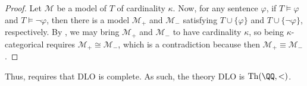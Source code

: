 \documentclass[../notes.tex]{subfiles}
\begin{document}
\begin{proof}
	Let $\mathcal M$ be a model of $T$ of cardinality $\kappa$. Now, for any sentence $\varphi$, if $T\models\varphi$ and $T\models\lnot\varphi$, then there is a model $\mathcal M_+$ and $\mathcal M_-$ satisfying $T\cup\{\varphi\}$ and $T\cup\{\lnot\varphi\}$, respectively. By , we may bring $\mathcal M_+$ and $\mathcal M_-$ to have cardinality $\kappa$, so being $\kappa$-categorical requires $\mathcal M_+\cong\mathcal M_-$, which is a contradiction because then $\mathcal M_+\equiv\mathcal M_-$.
\end{proof}
\begin{example}
	Thus,  requires that $\mathrm{DLO}$ is complete. As such, the theory $\mathrm{DLO}$ is $\mathrm{Th}(\QQ,<)$.
\end{example}
\end{document}
